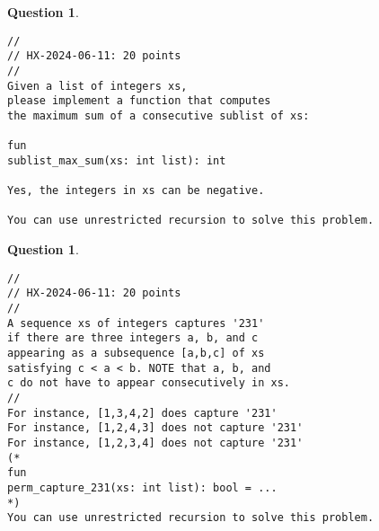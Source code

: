 \documentclass[12pt,fullpage]{article}
\newtheorem{question}[lemma]{Question}
\begin{document}
\vfill\newpage

\begin{question}~~
\begin{verbatim}
//
// HX-2024-06-11: 20 points
//
Given a list of integers xs,
please implement a function that computes
the maximum sum of a consecutive sublist of xs:

fun
sublist_max_sum(xs: int list): int

Yes, the integers in xs can be negative.

You can use unrestricted recursion to solve this problem.
\end{verbatim}
\end{question}

\vfill\newpage

\begin{question}~~
\begin{verbatim}
//
// HX-2024-06-11: 20 points
//
A sequence xs of integers captures '231'
if there are three integers a, b, and c
appearing as a subsequence [a,b,c] of xs
satisfying c < a < b. NOTE that a, b, and
c do not have to appear consecutively in xs.
//
For instance, [1,3,4,2] does capture '231'
For instance, [1,2,4,3] does not capture '231'
For instance, [1,2,3,4] does not capture '231'
(*
fun
perm_capture_231(xs: int list): bool = ...
*)
You can use unrestricted recursion to solve this problem.
\end{verbatim}
\end{question}

\vfill\newpage
\end{document}
